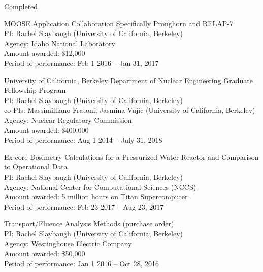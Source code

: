 \begin{rSubsection}{Completed}{}{}{}
\vspace*{0.3 em}
\item MOOSE Application Collaboration Specifically Pronghorn and RELAP-7\\ 
PI: Rachel Slaybaugh (University of California, Berkeley)\\
Agency: Idaho National Laboratory \\
Amount awarded: \$12,000\\
Period of performance: Feb 1 2016 -- Jan 31, 2017

\vspace*{0.3 em}
\item University of California, Berkeley Department of Nuclear Engineering Graduate Fellowship Program\\ 
PI: Rachel Slaybaugh (University of California, Berkeley)\\
\hspace*{1 em} co-PIs: Massimilliano Fratoni, Jasmina Vujic (University of California, Berkeley)\\
Agency: Nuclear Regulatory Commission \\
Amount awarded: \$400,000\\
Period of performance: Aug 1 2014 -- July 31, 2018

\vspace*{0.3 em}
\item Ex-core Dosimetry Calculations for a Pressurized Water Reactor and Comparison to Operational Data\\ 
PI: Rachel Slaybaugh (University of California, Berkeley)\\
Agency: National Center for Computational Sciences (NCCS)\\
Amount awarded: 5 million hours on Titan Supercomputer\\
Period of performance: Feb 23 2017 -- Aug 23, 2017

\vspace*{0.3 em}
\item Transport/Fluence Analysis Methods (purchase order)\\ 
PI: Rachel Slaybaugh (University of California, Berkeley)\\
Agency: Westinghouse Electric Company\\
Amount awarded: \$50,000\\
Period of performance: Jan 1 2016 -- Oct 28, 2016


\end{rSubsection}
